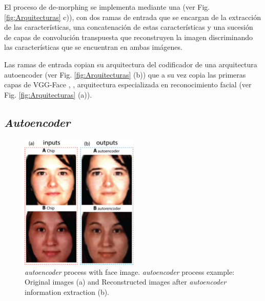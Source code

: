 El proceso de \gls{de-morphing} se implementa mediante una  (ver Fig. \ref{fig:Arquitecturas} c)), con dos ramas de entrada que se encargan de la extracción de las características, una concatenación de estas características y una sucesión de capas de convolución transpuesta que reconstruyen la imagen discriminando las características que se encuentran en ambas imágenes. 

Las ramas de entrada copian su arquitectura del codificador de una arquitectura \gls{autoencoder} (ver Fig. \ref{fig:Arquitecturas} (b)) que a su vez copia las primeras capas de \Gls{VGG-Face} \cite{parkhi2015deep}, \cite{cao2018vggface2}, arquitectura especializada en reconocimiento facial (ver Fig. \ref{fig:Arquitecturas} (a)). 



\subsection{\textit{Autoencoder}}  \label{ref:Autoencoderfaces}

\begin{figure}[t!]
    \centering
    \includegraphics[width=0.5\textwidth]{ch-sistemasABC/images/ch-morphing/AUTOENCODER_CRISTINA_BEA.png}
    \caption{\textit{\Gls{autoencoder}} process with face image. \textit{\Gls{autoencoder}} process example: Original images (a) and Reconstructed images after \textit{\gls{autoencoder}} information extraction (b).}
    \label{fig:autoencoderImages}
\end{figure}

